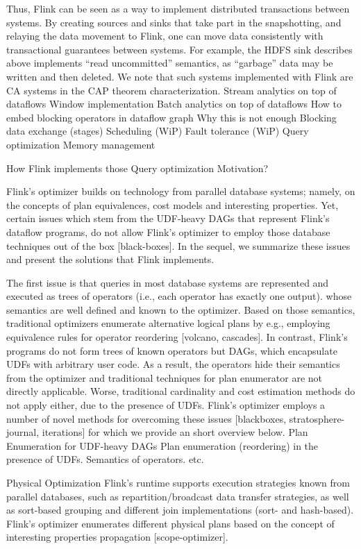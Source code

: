 \documentclass{sig-alternate}
\begin{document}
Thus, Flink can be seen as a way to implement distributed transactions between systems. By creating sources and sinks that take part in the snapshotting, and relaying the data movement to Flink, one can move data consistently with transactional guarantees between systems. For example, the HDFS sink describes above implements “read uncommitted” semantics, as “garbage” data may be written and then deleted. We note that such systems implemented with Flink are CA systems in the CAP theorem characterization. 
Stream analytics on top of dataflows
Window implementation
Batch analytics on top of dataflows
How to embed blocking operators in dataflow graph
Why this is not enough
Blocking data exchange (stages)
Scheduling (WiP)
Fault tolerance (WiP)
Query optimization
Memory management

How Flink implements those
Query optimization
Motivation?

Flink’s optimizer builds on technology from parallel database systems; namely, on the concepts of plan equivalences, cost models and interesting properties. Yet, certain issues which  stem from the UDF-heavy DAGs that represent Flink’s dataflow programs, do not allow Flink’s optimizer to employ those database techniques out of the box [black-boxes]. In the sequel, we summarize these issues and present the solutions that Flink implements.

The first issue is that queries in most database systems are represented and executed as trees of operators (i.e., each operator has exactly one output). whose semantics are well defined  and known to the optimizer. Based on those semantics, traditional optimizers enumerate alternative logical plans by e.g., employing equivalence rules for operator reordering [volcano, cascades]. In contrast, Flink’s programs do not form trees of known operators but DAGs, which encapsulate UDFs with arbitrary user code. As a result, the operators hide their semantics from the optimizer and traditional techniques for plan enumerator are not directly applicable. Worse, traditional cardinality and cost estimation methods do not apply either, due to the presence of UDFs. Flink’s optimizer employs a number of novel methods for overcoming these issues [blackboxes, stratosphere-journal, iterations] for which we provide an short overview below.
Plan Enumeration for UDF-heavy DAGs
Plan enumeration (reordering) in the presence of UDFs. Semantics of operators. etc.

Physical Optimization
Flink’s runtime supports execution strategies known from parallel databases, such as repartition/broadcast data transfer strategies, as well as sort-based grouping and different join implementations (sort- and hash-based). Flink’s optimizer enumerates different physical plans based on the concept of interesting properties propagation [scope-optimizer]. 
\end{document}
